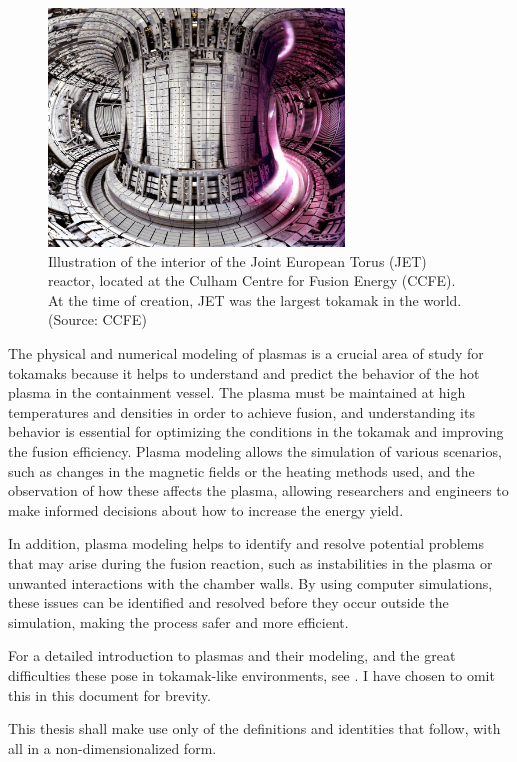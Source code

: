     \begin{figure}[!ht]
        \centering
        \includegraphics[width = 0.7\textwidth]{0 - introduction/images/JET.jpg}
        \caption{Illustration of the interior of the Joint European Torus (JET) reactor, located at the Culham Centre for Fusion Energy (CCFE). At the time of creation, JET was the largest tokamak in the world. (Source: CCFE)}
    \end{figure}

    \shortline

    The physical and numerical modeling of plasmas is a crucial area of study for tokamaks because it helps to understand and predict the behavior of the hot plasma in the containment vessel. The plasma must be maintained at high temperatures and densities in order to achieve fusion, and understanding its behavior is essential for optimizing the conditions in the tokamak and improving the fusion efficiency. Plasma modeling allows the simulation of various scenarios, such as changes in the magnetic fields or the heating methods used, and the observation of how these affects the plasma, allowing researchers and engineers to make informed decisions about how to increase the energy yield.

    In addition, plasma modeling helps to identify and resolve potential problems that may arise during the fusion reaction, such as instabilities in the plasma or unwanted interactions with the chamber walls. By using computer simulations, these issues can be identified and resolved before they occur outside the simulation, making the process safer and more efficient.
    
    \shortline

    \begin{remark}
        For a detailed introduction to plasmas and their modeling, and the great difficulties these pose in tokamak-like environments, see \cite{addendum_I}. I have chosen to omit this in this document for brevity.
        
        This thesis shall make use only of the definitions and identities that follow, with all in a non-dimensionalized form.
    \end{remark}

